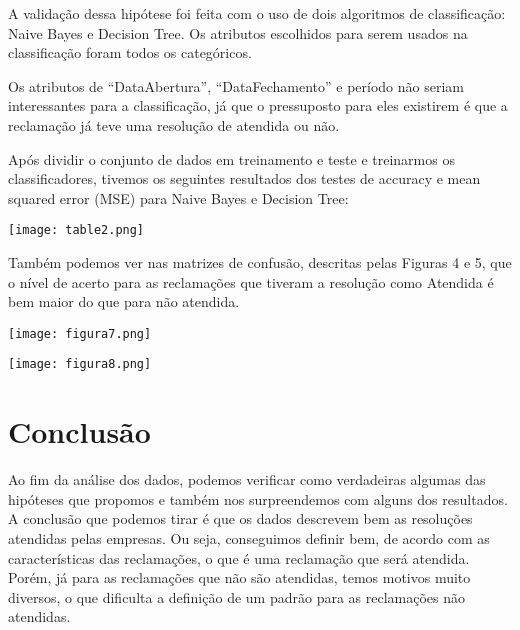 \documentclass[review]{elsarticle}
\begin{document}
	A validação dessa hipótese foi feita com o uso de dois algoritmos de classificação: Naive Bayes e Decision Tree. Os atributos escolhidos para serem usados na classificação foram todos os categóricos.
	
	Os atributos de “DataAbertura”, “DataFechamento” e período não seriam interessantes para a classificação, já que o pressuposto para eles existirem é que a reclamação já teve uma resolução de atendida ou não. 
	
	Após dividir o conjunto de dados em treinamento e teste e treinarmos os classificadores, tivemos os seguintes resultados dos testes de accuracy e mean squared error (MSE) para Naive Bayes e Decision Tree:
	
\vspace*{5px}	
	
\texttt{[image: table2.png]}

\vspace*{5px}

Também podemos ver nas matrizes de confusão, descritas pelas Figuras 4 e 5, que o nível de acerto para as reclamações que tiveram a resolução como Atendida é bem maior do que para não atendida.

\vspace*{10px}

\texttt{[image: figura7.png]}

\texttt{[image: figura8.png]}

\section{Conclusão}
Ao fim da análise dos dados, podemos verificar como verdadeiras algumas das hipóteses que propomos e também nos surpreendemos com alguns dos resultados. A conclusão que podemos tirar é que os dados descrevem bem as resoluções atendidas pelas empresas. Ou seja, conseguimos definir bem, de acordo com as características das reclamações, o que é uma reclamação que será atendida. Porém, já para as reclamações que não são atendidas, temos motivos muito diversos, o que dificulta a definição de um padrão para as reclamações não atendidas.
\end{document}
